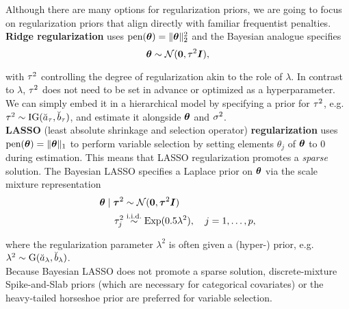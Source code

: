 Although there are many options for regularization priors, we are going to focus on regularization priors that align directly with familiar frequentist penalties.\\

\textbf{Ridge regularization} \citep{hoerl_ridge_1970,hoerl_ridge_1970-1} uses $\text{pen}(\bm{\theta}) = \|\bm{\theta}\|_2^2$ and the Bayesian analogue  specifies
\begin{equation}\label{eq:ridge}
    \bm{\theta} \sim \mathcal{N}(\bm{0}, \tau^2 \bm{I}),
\end{equation}

with $\tau^2$ controlling the degree of regularization akin to the role of $\lambda$.
In contrast to $\lambda$, $\tau^2$ does not need to be set in advance or optimized as a hyperparameter.
We can simply embed it in a hierarchical model by specifying a prior for $\tau^2$, e.g.\@ $\tau^2 \sim \text{IG}(\breve{a}_\tau, \breve{b}_\tau)$, and estimate it alongside $\bm{\theta}$ and $\sigma^2$.\\

\textbf{LASSO} (least absolute shrinkage and selection operator) \textbf{regularization} \citep{tibshirani_regression_1996} uses $\text{pen}(\bm{\theta}) = \|\bm{\theta}\|_1$ to perform variable selection by setting elements $\theta_j$ of $\bm{\theta}$ to $0$ during estimation.
This means that LASSO regularization promotes a \textit{sparse} solution.
The Bayesian LASSO specifies a Laplace prior on $\bm{\theta}$ via the scale mixture representation \citep{park_bayesian_2008}
\begin{equation}\label{eq:lasso}
    \begin{aligned}
        \bm{\theta} \mid \bm{\tau}^2 &\sim \mathcal{N}(\bm{0}, \bm{\tau}^2 \bm{I}) \\
        \tau^2_j &\overset{\text{i.i.d.}}{\sim} \text{Exp}(0.5 \lambda^2), \quad j = 1, \dots, p,
    \end{aligned}
\end{equation}

where the regularization parameter $\lambda^2$ is often given a (hyper-) prior, e.g.\@ $\lambda^2 \sim \text{G}(\breve{a}_\lambda, \breve{b}_\lambda)$.\\

Because Bayesian LASSO does not promote a sparse solution, discrete-mixture Spike-and-Slab priors \citep{mitchell_bayesian_1988} (which are necessary for categorical covariates) or the heavy-tailed horseshoe prior \citep{carvalho_horseshoe_2010} are preferred for variable selection.

